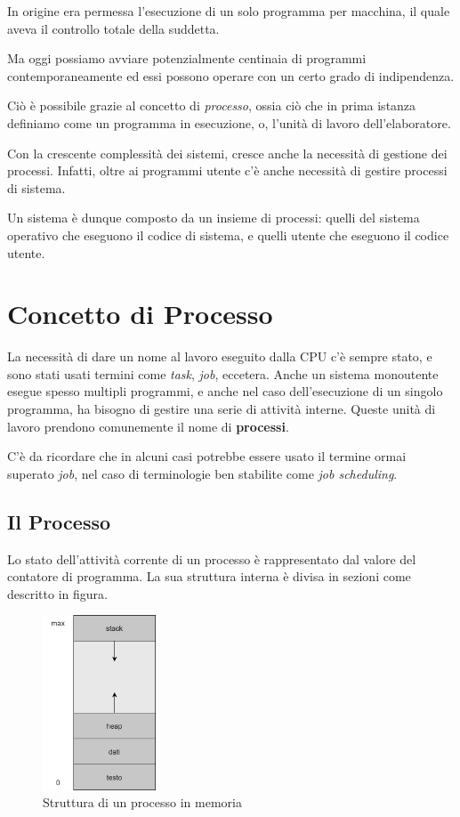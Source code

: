In origine era permessa l'esecuzione di un solo programma per macchina, il quale aveva il controllo totale della suddetta.

Ma oggi possiamo avviare potenzialmente centinaia di programmi contemporaneamente ed essi possono operare con un certo grado di indipendenza.

Ciò è possibile grazie al concetto di \textit{processo}, ossia ciò che in prima istanza definiamo come un programma in esecuzione, o, l'unità di lavoro dell'elaboratore.

Con la crescente complessità dei sistemi, cresce anche la necessità di gestione dei processi. Infatti, oltre ai programmi utente c'è anche necessità di gestire processi di sistema.

Un sistema è dunque composto da un insieme di processi: quelli del sistema operativo che eseguono il codice di sistema, e quelli utente che eseguono il codice utente.

\section{Concetto di Processo}
    La necessità di dare un nome al lavoro eseguito dalla CPU c'è sempre stato, e sono stati usati termini come \textit{task}, \textit{job}, eccetera. Anche un sistema monoutente esegue spesso multipli programmi, e anche nel caso dell'esecuzione di un singolo programma, ha bisogno di gestire una serie di attività interne. Queste unità di lavoro prendono comunemente il nome di \textbf{processi}.
    
    C'è da ricordare che in alcuni casi potrebbe essere usato il termine ormai superato \textit{job}, nel caso di terminologie ben stabilite come \textit{job scheduling}.
    
    \subsection{Il Processo}
        Lo stato dell'attività corrente di un processo è rappresentato dal valore del contatore di programma. La sua struttura interna è divisa in sezioni come descritto in figura.
        
        \begin{figure}[h]
            \centering
            \includegraphics[width=0.3\textwidth]{img/img6.png}
            \caption{Struttura di un processo in memoria}
            \label{fig:img6}
        \end{figure}
        
